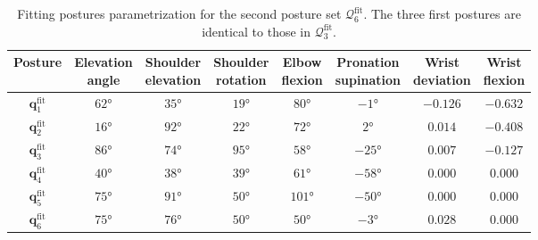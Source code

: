 \begin{table}[!htb]
    \centering
    \begin{tabular}{|c||c|c|c|c|c|c|c|}
    \hline
    Posture & \makecell{Elevation \\ angle} & \makecell{Shoulder \\ elevation} & \makecell{Shoulder \\ rotation} & \makecell{Elbow \\flexion} & \makecell{Pronation \\ supination} & \makecell{Wrist \\ deviation} & \makecell{Wrist \\ flexion} \\
    \hline
    $\mathbf{q}_1^{\text{fit}}$ & $62$° & $35$° & $19$° & $80$° & $-1$° & $-0.126$ & $-0.632$ \\
    $\mathbf{q}_2^{\text{fit}}$ & $16$° & $92$° & $22$° & $72$° & $2$° & $0.014$ & $-0.408$ \\
    $\mathbf{q}_3^{\text{fit}}$ & $86$° & $74$° & $95$° & $58$° & $-25$° & $0.007$ & $-0.127$ \\
    
    $\mathbf{q}_4^{\text{fit}}$ & $40$° & $38$° & $39$° & $61$° & $-58$° & $0.000$ & $0.000$ \\
    $\mathbf{q}_5^{\text{fit}}$ & $75$° & $91$° & $50$° & $101$° & $-50$° & $0.000$ & $0.000$ \\
    $\mathbf{q}_6^{\text{fit}}$ & $75$° & $76$° & $50$° & $50$° & $-3$° & $0.028$ & $0.000$ \\
    \hline
    \end{tabular}
    \caption{Fitting postures parametrization for the second posture set $\mathcal{Q}_6^{\text{fit}}$. The three first postures are identical to those in $\mathcal{Q}_3^{\text{fit}}$.}
    \label{tab:postures_fit_6_value}
\end{table}

